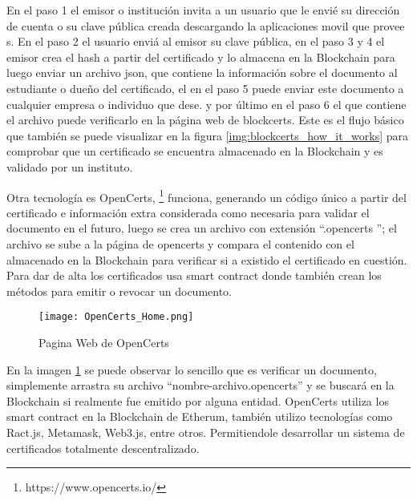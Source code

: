 En el paso 1 el emisor o institución invita a un usuario que le envié su dirección de cuenta o su clave pública creada 
descargando la aplicaciones movil que provee s. En el paso 2 el usuario enviá al emisor su clave pública,
en el paso 3 y 4 el emisor crea el hash a partir del certificado y lo almacena en la  Blockchain para luego enviar un archivo json, que contiene
la información sobre el documento al estudiante o dueño del certificado, el en el paso 5 puede enviar este documento a cualquier empresa o individuo que dese.
y por último en el paso 6 el que contiene el archivo puede verificarlo en la  página web de blockcerts. Este es el flujo básico que también se 
puede visualizar en  la figura \ref{img:blockcerts_how_it_works}   para comprobar que
un certificado se encuentra almacenado en la  Blockchain y es validado por un instituto.\cite[]{blockcerts_introduction_nodate}



Otra tecnología es OpenCerts, \footnote{https://www.opencerts.io/} funciona, generando 
un código único a partir del certificado e información extra considerada como necesaria para validar el documento en el futuro, luego se crea un archivo con extensión  “.opencerts ”;
el archivo se sube a la  página de opencerts y compara el contenido con el almacenado en la  Blockchain para verificar si a existido el certificado en cuestión.
Para dar de alta los certificados usa smart contract donde también crean los métodos para emitir o revocar un documento.

\begin{figure}[hbt!]
  \centering
  {\texttt{[image: OpenCerts\_Home.png]}}
  \caption{Pagina Web de OpenCerts}
  \label{img:opencerts_home}
\end{figure}

En la imagen \ref{img:opencerts_home} se puede observar lo sencillo que es verificar un documento, simplemente arrastra su  archivo “nombre-archivo.opencerts”
y se buscará en la  Blockchain si realmente fue emitido por alguna entidad.
OpenCerts utiliza los smart contract en la  Blockchain de Etherum, también utilizo tecnologías como Ract.js, Metamask, Web3.js, entre otros. Permitiendole desarrollar
un sistema de certificados totalmente descentralizado. \cite[]{opencerts_gestion_nodate}



